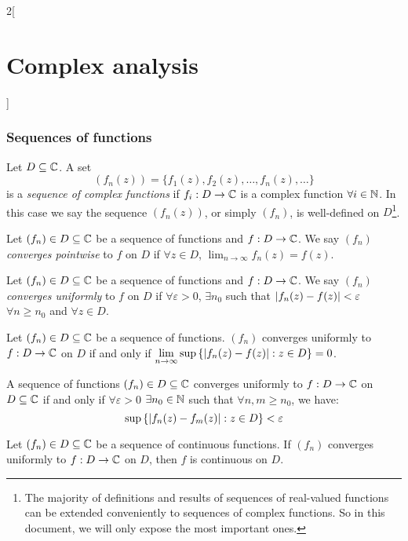 \documentclass[../../../main.tex]{subfiles}
\begin{document}
\begin{multicols}{2}[\section{Complex analysis}]
  \subsubsection{Sequences of functions}
  \begin{definition}
    Let $D\subseteq\mathbb{C}$. A set $$(f_n(z))=\{f_1(z),f_2(z),\ldots,f_n(z),\ldots\}$$ is a \emph{sequence of complex functions} if $f_i:D\rightarrow\mathbb{C} $ is a complex function $\forall i\in\mathbb{N}$. In this case we say the sequence $(f_n(z))$, or simply $(f_n)$, is well-defined on $D$\footnote{The majority of definitions and results of sequences of real-valued functions can be extended conveniently to sequences of complex functions. So in this document, we will only expose the most important ones.}.
  \end{definition}
  \begin{definition}
    Let $(f_n)\in D\subseteq\mathbb{C}$ be a sequence of functions and $f:D\rightarrow\mathbb{C}$. We say $(f_n)$ \emph{converges pointwise} to $f$ on $D$ if $\forall z\in D$, $\displaystyle\lim_{n\to\infty}f_n(z)=f(z)$.
  \end{definition}
  \begin{definition}
    Let $(f_n)\in D\subseteq\mathbb{C}$ be a sequence of functions and $f:D\rightarrow\mathbb{C}$. We say $(f_n)$ \emph{converges uniformly} to $f$ on $D$ if $\forall\varepsilon>0$, $\exists n_0$ such that $\abs{f_n(z)-f(z)}<\varepsilon$ $\forall n\geq n_0$ and $\forall z\in D$.
  \end{definition}
  \begin{lemma}
    Let $(f_n)\in D\subseteq\mathbb{C}$ be a sequence of functions. $(f_n)$ converges uniformly to $f:D\rightarrow\mathbb{C}$ on $D$ if and only if $\displaystyle \lim_{n\to\infty}\sup\left\{\abs{f_n(z)-f(z)}:z\in D\right\}=0$.
  \end{lemma}
  \begin{theorem}
    A sequence of functions $(f_n)\in D\subseteq\mathbb{C}$ converges uniformly to $f:D\rightarrow\mathbb{C}$ on $D\subseteq\mathbb{C}$ if and only if $\forall\varepsilon>0$ $\exists n_0\in\mathbb{N}$ such that  $\forall n,m\geq n_0$, we have: $$\sup\left\{\abs{f_n(z)-f_m(z)}:z\in D\right\}< \varepsilon$$
  \end{theorem}
  \begin{theorem}
    Let $(f_n)\in D\subseteq\mathbb{C}$ be a sequence of continuous functions. If $(f_n)$ converges uniformly to $f:D\rightarrow\mathbb{C}$ on $D$, then $f$ is continuous on $D$.
  \end{theorem}

\end{multicols}
\end{document}
